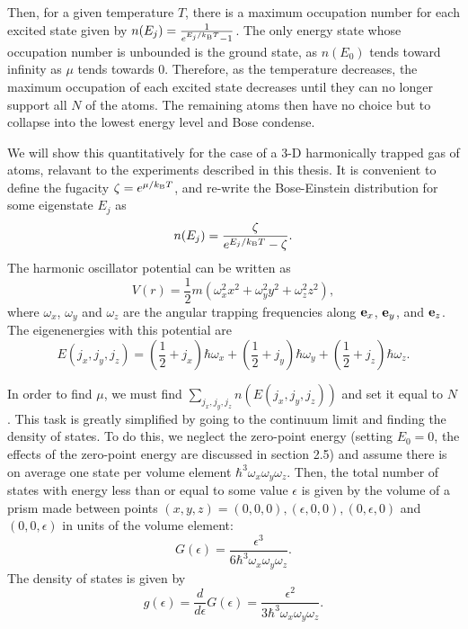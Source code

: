Then, for a given temperature $T$, there is a maximum occupation number for each excited state given by $n(E_j) = \frac{1}{e^{E_j/k_{\rm B}T}-1}$. The only energy state whose occupation number is unbounded is the ground state, as $n(E_0)$ tends toward infinity as $\mu$ tends towards $0$. Therefore, as the temperature decreases, the maximum occupation of each excited state decreases until they can no longer support all $N$ of the atoms. The remaining atoms then have no choice but to collapse into the lowest energy level and Bose condense. 

We will show this quantitatively for the case of a 3-D harmonically trapped gas of atoms, relavant to the experiments described in this thesis. It is convenient to define the fugacity $\zeta=e^{\mu/k_{\rm B}T}$, and re-write the Bose-Einstein distribution for some 
eigenstate $E_j$ as
\begin{equation}
n(E_j) = \frac{\zeta}{e^{E_j/k_{\rm B}T}-\zeta}.
\end{equation}
The harmonic oscillator potential can be written as 
\begin{equation}
V(r) = \frac{1}{2} m (\omega_x^2 x^2 + \omega_y^2 y^2 + \omega_z^2 z^2),
\end{equation}
where $\omega_x$, $\omega_y$ and $\omega_z$ are the angular trapping frequencies along ${\bf e}_x$, ${\bf e}_y$, and ${\bf e}_z$.  The eigenenergies with this potential are
\begin{equation}
E(j_x,j_y,j_z) = (\frac{1}{2} + j_x)\hbar\omega_x +(\frac{1}{2} + j_y)\hbar\omega_y+(\frac{1}{2} + j_z)\hbar\omega_z.
\end{equation}

In order to find $\mu$, we must find $\sum_{j_x,j_y,j_z}n(E(j_x,j_y,j_z))$ and set it equal to $N$. This task is greatly simplified by going to the continuum limit and finding the density of states. To do this, we neglect the zero-point energy (setting $E_0=0$, the effects of the zero-point energy are discussed in \cite{Pethick} section 2.5)  and assume there is on average one state per volume element $\hbar^3 \omega_x \omega_y \omega_z$. Then, the total number of states with energy less than or equal to some value $\epsilon$ is given by the volume of a prism made between points $(x,y,z)=(0,0,0),(\epsilon,0,0),(0,\epsilon,0)$ and $(0,0,\epsilon)$ in units of the volume element:
\begin{equation}
G(\epsilon) = \frac{\epsilon^3}{6\hbar^3\omega_x \omega_y \omega_z}.
\label{eqn:numberOfStates}
\end{equation}
The density of states is given by 
\begin{equation}
g(\epsilon) = \frac{d}{d\epsilon} G(\epsilon) = \frac{\epsilon^2}{3\hbar^3\omega_x \omega_y \omega_z}. 
\label{eqn:densityOfStates}
\end{equation}

